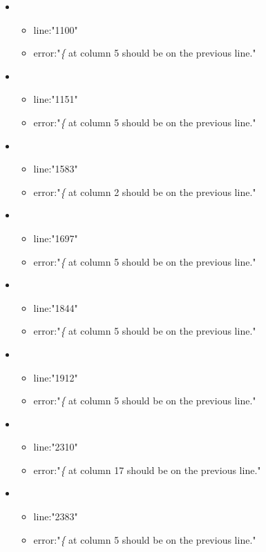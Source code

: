 \begin{itemize}
\begin{itemize}
	\end{itemize}
	\item 
	\begin{itemize} 
		\item line:"1100" 
		\item error:"\emph{\{} at column 5 should be on the previous line." 
	\end{itemize}
	\item 
	\begin{itemize} 
		\item line:"1151" 
		\item error:"\emph{\{} at column 5 should be on the previous line." 
	\end{itemize}
	\item 
	\begin{itemize} 
		\item line:"1583" 
		\item error:"\emph{\{} at column 2 should be on the previous line." 
	\end{itemize}
	\item 
	\begin{itemize} 
		\item line:"1697" 
		\item error:"\emph{\{} at column 5 should be on the previous line." 
	\end{itemize}
	\item 
	\begin{itemize} 
		\item line:"1844" 
		\item error:"\emph{\{} at column 5 should be on the previous line." 
	\end{itemize}
	\item 
	\begin{itemize} 
		\item line:"1912" 
		\item error:"\emph{\{} at column 5 should be on the previous line." 
	\end{itemize}
	\item 
	\begin{itemize} 
		\item line:"2310" 
		\item error:"\emph{\{} at column 17 should be on the previous line." 
	\end{itemize}
	\item 
	\begin{itemize} 
		\item line:"2383" 
		\item error:"\emph{\{} at column 5 should be on the previous line." 

\end{itemize}
\end{itemize}
